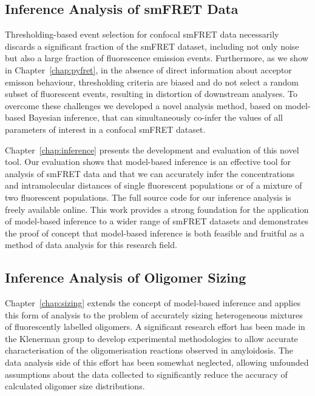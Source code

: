 \subsection{Inference Analysis of smFRET Data}
Thresholding-based event selection for confocal smFRET data necessarily discards a significant fraction of the smFRET dataset, including not only noise but also a large fraction of fluorescence emission events. Furthermore, as we show in Chapter~\ref{chap:pyfret}, in the absence of direct information about acceptor emisson behaviour, thresholding criteria are biased and do not select a random subset of fluorescent events, resulting in distortion of downstream analyses. To overcome these challenges we developed a novel analysis method, based on model-based Bayesian inference, that can simultaneously co-infer the values of all parameters of interest in a confocal smFRET dataset.

Chapter~\ref{chap:inference} presents the development and evaluation of this novel tool. Our evaluation shows that model-based inference is an effective tool for analysis of smFRET data and that we can accurately infer the concentrations and intramolecular distances of single fluorescent populations or of a mixture of two fluorescent populations. The full source code for our inference analysis is freely available online. This work provides a strong foundation for the application of model-based inference to a wider range of smFRET datasets and demonstrates the proof of concept that model-based inference is both feasible and fruitful as a method of data analysis for this research field.  

\subsection{Inference Analysis of Oligomer Sizing}
Chapter~\ref{chap:sizing} extends the concept of model-based inference and applies this form of analysis to the problem of accurately sizing heterogeneous mixtures of fluorescently labelled oligomers. A significant research effort has been made in the Klenerman group to develop experimental methodologies to allow accurate characterisation of the oligomerisation reactions observed in amyloidosis. The data analysis side of this effort has been somewhat neglected, allowing unfounded assumptions about the data collected to significantly reduce the accuracy of calculated oligomer size distributions.

